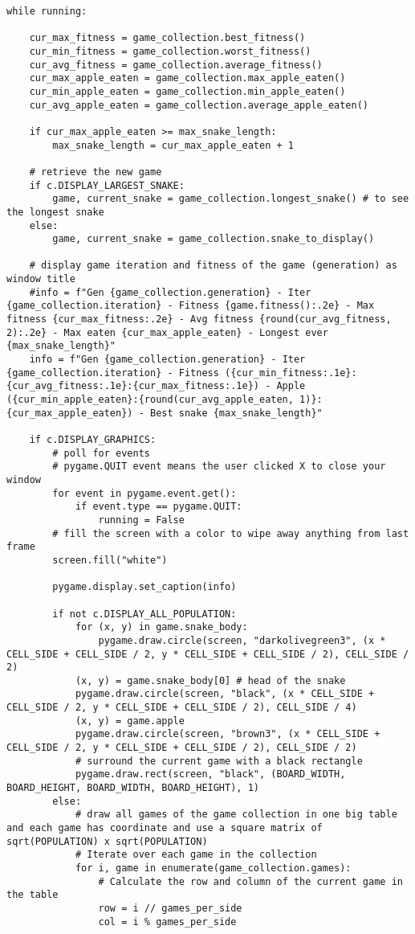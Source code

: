 \documentclass[11pt,a4paper]{article}
\begin{document}
\begin{verbatim}
while running:

    cur_max_fitness = game_collection.best_fitness()
    cur_min_fitness = game_collection.worst_fitness()
    cur_avg_fitness = game_collection.average_fitness()
    cur_max_apple_eaten = game_collection.max_apple_eaten()
    cur_min_apple_eaten = game_collection.min_apple_eaten()
    cur_avg_apple_eaten = game_collection.average_apple_eaten()

    if cur_max_apple_eaten >= max_snake_length:
        max_snake_length = cur_max_apple_eaten + 1

    # retrieve the new game
    if c.DISPLAY_LARGEST_SNAKE:
        game, current_snake = game_collection.longest_snake() # to see the longest snake
    else:
        game, current_snake = game_collection.snake_to_display()

    # display game iteration and fitness of the game (generation) as window title
    #info = f"Gen {game_collection.generation} - Iter {game_collection.iteration} - Fitness {game.fitness():.2e} - Max fitness {cur_max_fitness:.2e} - Avg fitness {round(cur_avg_fitness, 2):.2e} - Max eaten {cur_max_apple_eaten} - Longest ever {max_snake_length}"
    info = f"Gen {game_collection.generation} - Iter {game_collection.iteration} - Fitness ({cur_min_fitness:.1e}:{cur_avg_fitness:.1e}:{cur_max_fitness:.1e}) - Apple ({cur_min_apple_eaten}:{round(cur_avg_apple_eaten, 1)}:{cur_max_apple_eaten}) - Best snake {max_snake_length}"

    if c.DISPLAY_GRAPHICS:
        # poll for events
        # pygame.QUIT event means the user clicked X to close your window
        for event in pygame.event.get():
            if event.type == pygame.QUIT:
                running = False
        # fill the screen with a color to wipe away anything from last frame
        screen.fill("white")

        pygame.display.set_caption(info)

        if not c.DISPLAY_ALL_POPULATION:
            for (x, y) in game.snake_body:
                pygame.draw.circle(screen, "darkolivegreen3", (x * CELL_SIDE + CELL_SIDE / 2, y * CELL_SIDE + CELL_SIDE / 2), CELL_SIDE / 2)
            (x, y) = game.snake_body[0] # head of the snake
            pygame.draw.circle(screen, "black", (x * CELL_SIDE + CELL_SIDE / 2, y * CELL_SIDE + CELL_SIDE / 2), CELL_SIDE / 4)
            (x, y) = game.apple
            pygame.draw.circle(screen, "brown3", (x * CELL_SIDE + CELL_SIDE / 2, y * CELL_SIDE + CELL_SIDE / 2), CELL_SIDE / 2)
            # surround the current game with a black rectangle
            pygame.draw.rect(screen, "black", (BOARD_WIDTH, BOARD_HEIGHT, BOARD_WIDTH, BOARD_HEIGHT), 1)
        else:
            # draw all games of the game collection in one big table and each game has coordinate and use a square matrix of sqrt(POPULATION) x sqrt(POPULATION)
            # Iterate over each game in the collection
            for i, game in enumerate(game_collection.games):
                # Calculate the row and column of the current game in the table
                row = i // games_per_side
                col = i % games_per_side


\end{verbatim}
\end{document}
